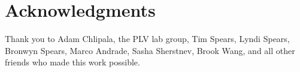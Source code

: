 

\chapter*{Acknowledgments}


Thank you to Adam Chlipala, the PLV lab group, Tim Spears, Lyndi Spears, Bronwyn Spears, Marco Andrade, Sasha Sherstnev, Brook Wang, and all other friends who made this work possible. 

